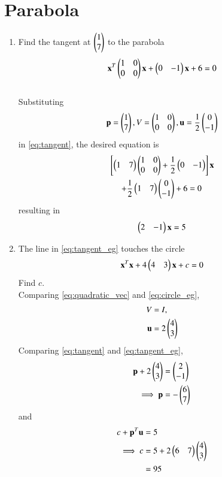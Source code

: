 \documentclass[journal,12pt,twocolumn]{IEEEtran}
\renewcommand\thesection{\arabic{section}}
\begin{document}
\section{Parabola}
\begin{enumerate}[label=\thesection.\arabic*
,ref=\thesection.\theenumi]
\item Find the tangent at $\begin{pmatrix}1 \\ 7\end{pmatrix}$ to the parabola
\begin{equation}
\mathbf{x}^T\begin{pmatrix}1 & 0 \\ 0 & 0\end{pmatrix}\mathbf{x} + \begin{pmatrix}0 & -1\end{pmatrix}\mathbf{x} + 
6 = 0
\end{equation}
\\
\solution Substituting
\begin{equation}
\mathbf{p} = \begin{pmatrix}1 \\ 7\end{pmatrix}, V = \begin{pmatrix}1 & 0 \\ 0 & 0\end{pmatrix}, \mathbf{u} = \frac{1}{2}\begin{pmatrix}0 \\ -1\end{pmatrix}
\end{equation}
%
in \eqref{eq:tangent}, the desired equation is
\begin{multline}
{}\left[\begin{pmatrix} 1 & 7\end{pmatrix}\begin{pmatrix}1 & 0 \\ 0 & 0\end{pmatrix}+\frac{1}{2}\begin{pmatrix}0 & -1\end{pmatrix}\right]\mathbf{x} 
\\
+ \frac{1}{2}\begin{pmatrix} 1 & 7\end{pmatrix}\begin{pmatrix}0 \\
-1\end{pmatrix} 
+6 = 0
\end{multline}
resulting in
\begin{equation}
\begin{pmatrix} 2 & -1\end{pmatrix}\mathbf{x} 
 = 5
\label{eq:tangent_eg}
\end{equation}
\item The line in \eqref{eq:tangent_eg}
touches the circle
\begin{equation}
\mathbf{x}^T\mathbf{x} + 4 \begin{pmatrix}4 & 3\end{pmatrix}\mathbf{x} + c = 0
\label{eq:circle_eg}
\end{equation}
Find $c$.
\\
\solution Comparing \eqref{eq:quadratic_vec} and \eqref{eq:circle_eg},
\begin{align}
\begin{split}
V &= I,
\\
\mathbf{u} &= 2 \begin{pmatrix}4 \\ 3\end{pmatrix}
\end{split}
\end{align}
%
Comparing \eqref{eq:tangent} and \eqref{eq:tangent_eg},
\begin{align}
\mathbf{p}+2 \begin{pmatrix}4 \\ 3\end{pmatrix} &= \begin{pmatrix}2 \\ -1\end{pmatrix}
\\
\implies \mathbf{p} &= -\begin{pmatrix}6 \\ 7\end{pmatrix}
\end{align}
%
and
\begin{align}
c +\mathbf{p}^T\mathbf{u}&= 5
\\
\implies c &= 5+2\begin{pmatrix}6 & 7\end{pmatrix}  \begin{pmatrix}4 \\ 3\end{pmatrix}
\\
 &= 95
\end{align}
\end{enumerate}
\end{document}
